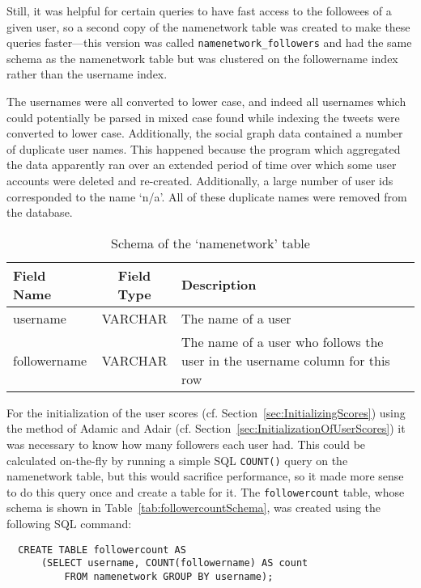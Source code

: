 Still, it was helpful for certain queries to have fast access to the followees of a given user, so a second copy of the namenetwork table was created to make these queries faster---this version was called \texttt{namenetwork\_followers} and had the same schema as the namenetwork table but was clustered on the followername index rather than the username index.

The usernames were all converted to lower case, and indeed all usernames which could potentially be parsed in mixed case found while indexing the tweets were converted to lower case. Additionally, the social graph data contained a number of duplicate user names. This happened because the program which aggregated the data apparently ran over an extended period of time over which some user accounts were deleted and re-created. Additionally, a large number of user ids corresponded to the name `n/a'. All of these duplicate names were removed from the database.

\begin{table}
\centering
\begin{tabular}{l|c|p{8cm}}
{\bf Field Name} & {\bf Field Type} & {\bf Description} \\ \hline
username & VARCHAR & The name of a user \\ \hline
followername & VARCHAR & The name of a user who follows the user in the username column for this row \\
\end{tabular}
\caption{Schema of the `namenetwork' table}
\label{tab:namenetworkSchema}
\end{table}


For the initialization of the user scores (cf. Section~\ref{sec:InitializingScores}) using the method of Adamic and Adair (cf. Section~\ref{sec:InitializationOfUserScores}) it was necessary to know how many followers each user had. This could be calculated on-the-fly by running a simple SQL \texttt{COUNT()} query on the namenetwork table, but this would sacrifice performance, so it made more sense to do this query once and create a table for it. The \texttt{followercount} table, whose schema is shown in Table~\ref{tab:followercountSchema}, was created using the following SQL command:

\begin{verbatim}
  CREATE TABLE followercount AS
      (SELECT username, COUNT(followername) AS count
          FROM namenetwork GROUP BY username);
\end{verbatim}

